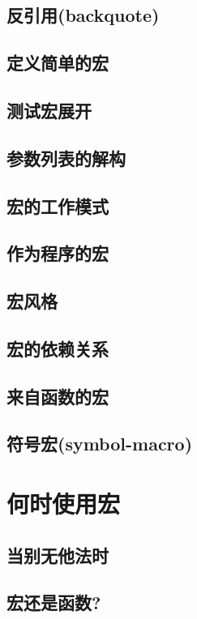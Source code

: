 \documentclass{ctexart}
\begin{document}
\subsection{反引用(backquote)}
\label{sec-7-2}
\subsection{定义简单的宏}
\label{sec-7-3}
\subsection{测试宏展开}
\label{sec-7-4}
\subsection{参数列表的解构}
\label{sec-7-5}
\subsection{宏的工作模式}
\label{sec-7-6}
\subsection{作为程序的宏}
\label{sec-7-7}
\subsection{宏风格}
\label{sec-7-8}
\subsection{宏的依赖关系}
\label{sec-7-9}
\subsection{来自函数的宏}
\label{sec-7-10}
\subsection{符号宏(symbol-macro)}
\label{sec-7-11}
\section{何时使用宏}
\label{sec-8}
\subsection{当别无他法时}
\label{sec-8-1}
\subsection{宏还是函数?}
\label{sec-8-2}
\end{document}

